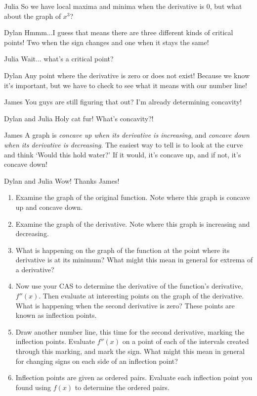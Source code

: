 \documentclass{ximera}
\begin{document}
\begin{enumerate}
\begin{dialogue}
\item[Julia] So we have local maxima and minima when the derivative is 0, but what about the graph of $x^3$? 
\end{dialogue}
\begin{center}
\end{center}
\begin{dialogue}
\item[Dylan] Hmmm...I guess that means there are three different kinds of critical points! Two when the sign changes and one when it stays the same!
\item[Julia] Wait... what's a critical point?
\item[Dylan] Any point where the derivative is zero or does not exist! Because we know it's important, but we have to check to see what it means with our number line!
\item[James] You guys are still figuring that out? I'm already determining concavity!
\item[Dylan and Julia] Holy cat fur! What's concavity?!
\item[James] A graph is \textit{concave up when its derivative is increasing}, and \textit{concave down when its derivative is decreasing}. The easiest way to tell is to look at the curve and think `Would this hold water?' If it would, it's concave up, and if not, it's concave down!
\item[Dylan and Julia] Wow! Thanks James!
\end{dialogue}
\begin{enumerate}
\item{Examine the graph of the original function. Note where this graph is concave up and concave down.}
\item{Examine the graph of the derivative. Note where this graph is increasing and decreasing.}
\item{What is happening on the graph of the function at the point where its derivative is at its minimum? What might this mean in general for extrema of a derivative?}
\item{Now use your CAS to determine the derivative of the function's derivative, $f''(x)$. Then evaluate at interesting points on the graph of the derivative. What is happening when the second derivative is zero? These points are known as inflection points.}
\item{Draw another number line, this time for the second derivative, marking the inflection points. Evaluate $f''(x)$ on a point of each of the intervals created through this marking, and mark the sign. What might this mean in general for changing signs on each side of an inflection point?}
\item{Inflection points are given as ordered pairs. Evaluate each inflection point you found using $f(x)$ to determine the ordered pairs.}
\end{enumerate}
\end{enumerate}
\end{document}
